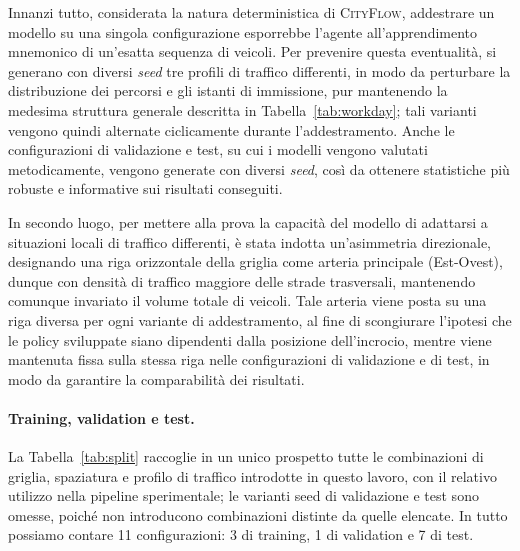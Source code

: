 Innanzi tutto, considerata la natura deterministica di \textsc{CityFlow},
addestrare un modello su una singola configurazione esporrebbe l'agente all'apprendimento mnemonico di un'esatta sequenza di veicoli.
Per prevenire questa eventualità, si generano con diversi \emph{seed} tre profili di traffico differenti, in modo da perturbare
la distribuzione dei percorsi e gli istanti di immissione, pur mantenendo la medesima struttura generale descritta in Tabella~\ref{tab:workday};
tali varianti vengono quindi alternate ciclicamente durante l'addestramento.
Anche le configurazioni di validazione e test, su cui i modelli vengono valutati metodicamente, vengono generate con diversi \emph{seed},
così da ottenere statistiche più robuste e informative sui risultati conseguiti.

In secondo luogo, per mettere alla prova la capacità del modello di adattarsi a situazioni locali di traffico differenti,
è stata indotta un'asimmetria direzionale, designando una riga orizzontale della griglia come arteria principale (Est-Ovest),
dunque con densità di traffico maggiore delle strade trasversali, mantenendo comunque invariato il volume totale di veicoli.
Tale arteria viene posta su una riga diversa per ogni variante di addestramento, al fine di scongiurare l'ipotesi che le policy sviluppate siano dipendenti dalla posizione dell'incrocio,
mentre viene mantenuta fissa sulla stessa riga nelle configurazioni di validazione e di test, in modo da garantire la comparabilità dei risultati.

\paragraph{Training, validation e test.} La Tabella~\ref{tab:split}
raccoglie in un unico prospetto tutte le combinazioni di griglia, spaziatura
e profilo di traffico introdotte in questo lavoro, con il relativo utilizzo
nella pipeline sperimentale; le varianti seed di validazione e test sono
omesse, poiché non introducono combinazioni distinte da quelle elencate.
In tutto possiamo contare 11 configurazioni: 3 di training, 1 di validation e 7 di test.

